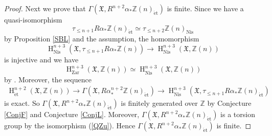 \documentclass{article}
\newcommand{\et}{\mathrm{\acute{e}t}}
\newcommand{\Nis}{\mathrm{Nis}}
\newcommand{\Zar}{\mathrm{Zar}}
\newcommand{\HO}{\operatorname{H}}
\begin{document}
\begin{proof}
Next we prove that 
%
\begin{math}
\Gamma\left(
\mathfrak{X},
R^{n+2}\alpha_{*}
\mathbb{Z}(n)_{\et}
\right)
\end{math}
%
is finite.
Since we have a quasi-isomorphism
%
\begin{equation}\label{BLN12}
\tau_{\leq n+1}R\alpha_{*}\mathbb{Z}(n)_{\et}
\simeq 
\tau_{\leq n+2}\mathbb{Z}(n)_{\Nis}
\end{equation}
%
by Proposition \ref{SBL} and the assumption, the homomorphism
%
\begin{equation*}
\HO^{n+3}_{\Nis}(
\mathfrak{X},
\tau_{\leq n+1}R\alpha_{*}
\mathbb{Z}(n)
)
\to
\HO^{n+3}_{\Nis}(
\mathfrak{X},
\mathbb{Z}(n)
)
\end{equation*}
%
is injective and we have
%
\begin{equation*}
\HO^{n+3}_{\Zar}(
\mathfrak{X},
\mathbb{Z}(n)
)
\simeq
\HO^{n+3}_{\Nis}(
\mathfrak{X},
\mathbb{Z}(n)
)
\end{equation*}
%
by \cite[p.781, Proposition 3.6]{Ge}.
Moreover, the sequence
%
\begin{align*}
\HO^{n+2}_{\et}(
\mathfrak{X},
\mathbb{Z}(n)
)    
\to
\Gamma\left(
\mathfrak{X},
R\alpha_{*}^{n+2}
\mathbb{Z}(n)_{\et}
\right)
\to
\HO^{n+3}_{\Nis}(
\mathfrak{X},
\tau_{\leq n+1}R\alpha_{*}
\mathbb{Z}(n)_{\et}
)
\end{align*}
%
is exact. So 
%
\begin{math}
\Gamma\left(\mathfrak{X}, R^{n+2}\alpha_{*}\mathbb{Z}(n)_{\et}\right)
\end{math}
%
is finitely generated 
over $\mathbb{Z}$ by Conjecture \ref{ConjF} and Conjecture \ref{ConjL}. 
Moreover, 
%
\begin{math}
\Gamma\left(\mathfrak{X}, R^{n+2}\alpha_{*}\mathbb{Z}(n)_{\et}\right)
\end{math}
%
is a torsion group by the isomorphism (\ref{QZu}). Hence 
%
\begin{math}
\Gamma\left(\mathfrak{X}, R^{n+2}\alpha_{*}\mathbb{Z}(n)_{\et}\right)
\end{math}
%
is finite.


\end{proof}
\end{document}
